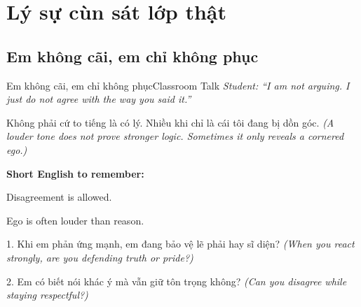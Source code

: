 \chapter{Lý sự cùn sát lớp thật}

\section{Em không cãi, em chỉ không phục}
\begin{truyen}{Em không cãi, em chỉ không phục}{Classroom Talk}
\textit{Student: ``I am not arguing. I just do not agree with the way you said it.''}\\[4pt]



\end{truyen}

\begin{baihoc}
Không phải cứ to tiếng là có lý. Nhiều khi chỉ là cái tôi đang bị dồn góc.
\textit{(A louder tone does not prove stronger logic. Sometimes it only reveals a cornered ego.)}
\end{baihoc}

\begin{ghinhoanh}
\textbf{Short English to remember:}

Disagreement is allowed.

Ego is often louder than reason.
\end{ghinhoanh}

\begin{tuhocnhanh}
1. Khi em phản ứng mạnh, em đang bảo vệ lẽ phải hay sĩ diện? \textit{(When you react strongly, are you defending truth or pride?)}

2. Em có biết nói khác ý mà vẫn giữ tôn trọng không? \textit{(Can you disagree while staying respectful?)}
\end{tuhocnhanh}
\ngancach

